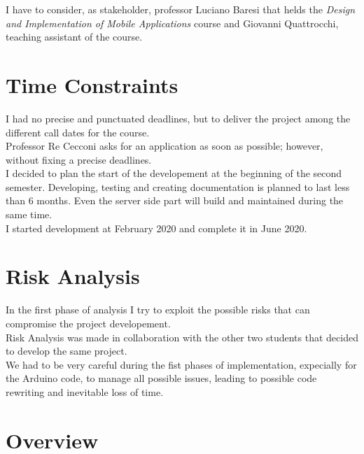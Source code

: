 I have to consider, as stakeholder, professor Luciano Baresi that helds the \textit{Design and Implementation of Mobile Applications} course and Giovanni Quattrocchi, teaching assistant of the course.

\section{Time Constraints}
I had no precise and punctuated deadlines, but to deliver the project among the different call dates for the course.\\

Professor Re Cecconi asks for an application as soon as possible; however, without fixing a precise deadlines.\\

I decided to plan the start of the developement at the beginning of the second semester. Developing, testing and creating documentation is planned to last less than 6 months. Even the server side part will build and maintained during the same time.\\

I started development at February 2020 and complete it in June 2020.

\section{Risk Analysis}
In the first phase of analysis I try to exploit the possible risks that can compromise the project developement.\\

Risk Analysis was made in collaboration with the other two students that decided to develop the same project.\\

We had to be very careful during the fist phases of implementation, expecially for the Arduino code, to manage all possible issues, leading to possible code rewriting and inevitable loss of time.

\section{Overview}